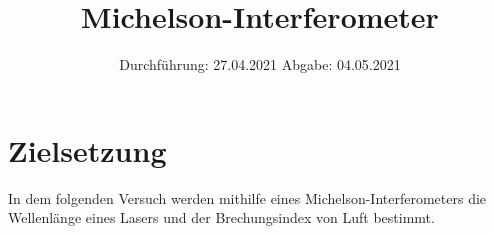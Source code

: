 

\subject{V401}
\title{Michelson-Interferometer}
\date{
    Durchführung: 27.04.2021
    \hspace{3em}
    Abgabe: 04.05.2021
}



\maketitle
\thispagestyle{empty}
\tableofcontents
\newpage

\section{Zielsetzung}

    In dem folgenden Versuch werden mithilfe eines Michelson-Interferometers
    die Wellenlänge eines Lasers und der Brechungsindex von Luft bestimmt.


\clearpage


\clearpage


\clearpage


\clearpage

\printbibliography


